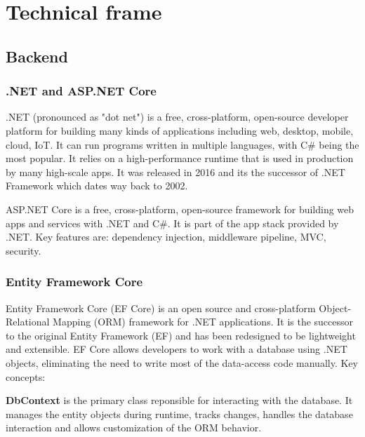 \chapter{Technical frame}
\label{chap:ch3}

\section{Backend}

\subsection{.NET and ASP.NET Core}

\par .NET (pronounced as "dot net") is a free, cross-platform, open-source developer platform for building many kinds of applications including web, desktop, mobile, cloud, IoT. It can run programs written in multiple languages, with C\# being the most popular. It relies on a high-performance runtime that is used in production by many high-scale apps. \cite{microsoftIntroDotNet} It was released in 2016 and its the successor of .NET Framework which dates way back to 2002.

\par ASP.NET Core is a free, cross-platform, open-source framework for building web apps and services with .NET and C\#. It is part of the app stack provided by .NET. Key features are: dependency injection, middleware pipeline, MVC, security.

\subsection{Entity Framework Core}

\par Entity Framework Core (EF Core) is an open source and cross-platform Object-Relational Mapping (ORM) framework for .NET applications. It is the successor to the original Entity Framework (EF) and has been redesigned to be lightweight and extensible. EF Core allows developers to work with a database using .NET objects, eliminating the need to write most of the data-access code manually. Key concepts:

\par \textbf{DbContext} is the primary class reponsible for interacting with the database. It manages the entity objects during runtime, tracks changes, handles the database interaction and allows customization of the ORM behavior.

